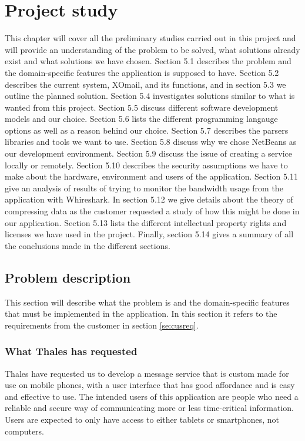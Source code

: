 \chapter{Project study}
This chapter will cover all the preliminary studies carried out in this project and will provide an understanding of the problem to be solved, what solutions already exist and what solutions we have chosen. Section 5.1 describes the problem and the domain-specific features the application is supposed to have. Section 5.2 describes the current system, XOmail, and its functions, and in section 5.3 we outline the planned solution. Section 5.4 investigates solutions similar to what is wanted from this project. Section 5.5 discuss different software development models and our choice. Section 5.6 lists the different programming langauge options as well as a reason behind our choice. Section 5.7 describes the parsers libraries and tools we want to use. Section 5.8 discuss why we chose NetBeans as our development environment. Section 5.9 discuss the issue of creating a service locally or remotely. Section 5.10 describes the security assumptions we have to make about the hardware, environment and users of the application. Section 5.11 give an analysis of results of trying to monitor the bandwidth usage from the application with Whireshark. In section 5.12 we  give details about the theory of compressing data as the customer requested a study of how this might be done in our application. Section 5.13 lists the different intellectual property rights and licenses we have used in the project. Finally, section 5.14 gives a summary of all the conclusions made in the different sections.


\section{Problem description}

This section will describe what the problem is and the domain-specific features that must be implemented in the application. In this section it refers to the requirements from the customer in section \ref{se:cusreq}.

\subsection{What Thales has requested}
Thales have requested us to develop a message service that is custom made for use on mobile phones, with a user interface that has good affordance and is easy and effective to use.
\newline
\newline
The intended users of this application are people who need a reliable and secure way of communicating more or less time-critical information. Users are expected to only have access to either tablets or smartphones, not computers.

